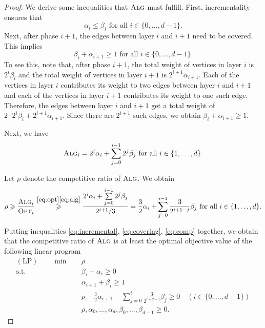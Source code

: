 \documentclass[a4paper,USenglish,cleveref,autoref,thm-restate,pdfa]{lipics-v2021}
\let\leq\leqslant
\let\geq\geqslant
\newcommand{\alg}{\textsc{Alg}\xspace}
\newcommand{\opt}{\textsc{Opt}\xspace}
\newcommand{\compratio}{\rho}
\begin{document}
\begin{proof}
We derive some inequalities that $\alg$ must fulfill. First, incrementality ensures that
\begin{equation}\label{eq:incremental}
\alpha_i \leq \beta_i \text{ for all } i\in \{0, \dots, d-1\}.
\end{equation}
Next, after phase $i+1$, the edges between layer $i$ and $i+1$ need to be covered. This implies
\begin{equation}\label{eq:covering}
\beta_i + \alpha_{i+1} \geq 1 \text{ for all } i\in \{0, \dots, d-1\}.
\end{equation}
To see this, note that, after phase $i+1$, the total weight of vertices in layer $i$ is $2^i \beta_i$ and the total weight of vertices in layer $i+1$ is $2^{i+1}\alpha_{i+1}$. Each of the vertices in layer $i$ contributes its weight to two edges between layer $i$ and $i+1$ and each of the vertices in layer $i+1$ contributes its weight to one such edge. Therefore, the edges between layer $i$ and $i+1$ get a total weight of $2\cdot 2^{i} \beta_i+2^{i+1}\alpha_{i+1}$. Since there are $2^{i+1}$ such edges, we obtain $\beta_{i}+\alpha_{i+1}\geq 1$.

Next, we have
\begin{equation}\label{eq:alg}
\alg_i=2^i \alpha_i + \sum\limits_{j=0}^{i-1}2^j \beta_j \text{ for all } i\in \{1, \dots, d\}.
\end{equation}

Let $\compratio$ denote the competitive ratio of $\alg$. We obtain
\begin{equation}\label{eq:comp}
\compratio\geq \frac{\alg_i}{\opt_i}
\overset{\eqref{eq:opt} \eqref{eq:alg}}{\geq} \frac{2^i \alpha_i + \sum\limits_{j=0}^{i-1}2^j \beta_j}{2^{i+1}/3}
= \frac{3}{2}\alpha_i + \sum\limits_{j=0}^{i-1} \frac{3}{2^{i+1-j}} \beta_j
 \text{ for all } i\in \{1, \dots, d\}.
\end{equation}

Putting inequalities \eqref{eq:incremental}, \eqref{eq:covering}, \eqref{eq:comp} together, we obtain that the competitive ratio of $\alg$ is at least the optimal objective value of the following linear program
\begin{align*}
\mathrm{(LP)}\qquad  \min \quad& \compratio \\
  \text{s.t.}  \quad& \beta_i-\alpha_i\geq 0\\
& \alpha_{i+1}+\beta_i \geq 1\\
& \compratio -\frac{3}{2}\alpha_{i+1} - \sum\limits_{j=0}^{i} \frac{3}{2^{i+2-j}} \beta_j \geq 0 \quad (i\in \{0, \dots, d-1\})\\
& \compratio, \alpha_0, \dots, \alpha_d, \beta_0, \dots, \beta_{d-1} \geq 0.
\end{align*}


\end{proof}
\end{document}
